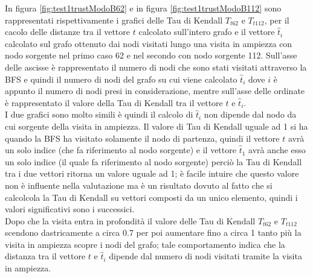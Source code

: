 In figura \ref{fig:test1trustModoB62} e in figura \ref{fig:test1trustModoB112} sono rappresentati rispettivamente i grafici delle Tau di Kendall \(T_{t62}\) e \(T_{t112}\), per il cacolo delle distanze tra il vettore \(t\) calcolato sull'intero grafo e il vettore \(\hat{t}_i\) calcolato sul grafo ottenuto dai nodi visitati lungo una visita in ampiezza con nodo sorgente nel primo caso 62 e nel secondo con nodo sorgente 112.  Sull'asse delle ascisse è rappresentato il numero di nodi che sono stati visitati attraverso la BFS e quindi il numero di nodi del grafo su cui viene calcolato \(\hat{t}_i\) dove \(i\) è appunto il numero di nodi presi in considerazione, mentre sull'asse delle ordinate è rappresentato il valore della Tau di Kendall tra il vettore \(t\) e \(\hat{t}_i\).\\
I due grafici sono molto simili è quindi il calcolo di \(\hat{t}_i\) non dipende dal nodo da cui sorgente della visita in ampiezza. Il valore di Tau di Kendall uguale ad 1 si ha quando la BFS ha visitato solamente il nodo di partenza, quindi  il vettore \(t\) avrà un solo indice (che fa riferimento al nodo sorgente) e il vettore \(\hat{t}_1\) avrà anche esso un solo indice (il quale fa riferimento al nodo sorgente) perciò  la Tau di Kendall tra i due vettori ritorna un valore uguale ad 1; è facile intuire che questo valore non è influente nella valutazione ma è un risultato dovuto al fatto che si calcolcola la Tau di Kendall su vettori composti da un unico elemento, quindi i valori significativi sono i successici.\\
Dopo che la visita entra in profondità il valore delle Tau di Kendall \(T_{t62}\) e \(T_{t112}\)  scendono dastricamente a circa 0.7 per poi aumentare fino a circa 1 tanto più la visita in ampiezza scopre i nodi del grafo; tale comportamento indica che la distanza tra il vettore \(t\) e \(\hat{t}_i\) dipende dal numero di nodi visitati tramite la visita in ampiezza. 

